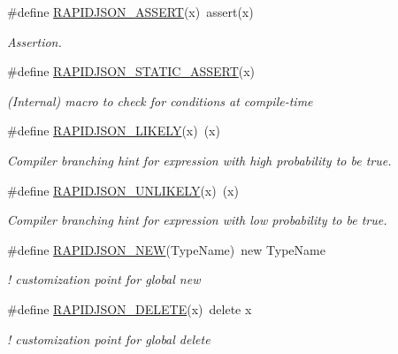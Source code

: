 \begin{DoxyCompactItemize}
\item 
\#define \hyperlink{a00833_gabeba18d612187bad2ac62aed9276d47c}{R\+A\+P\+I\+D\+J\+S\+O\+N\+\_\+\+A\+S\+S\+E\+RT}(x)~assert(x)
\begin{DoxyCompactList}\small\item\em Assertion. \end{DoxyCompactList}\item 
\#define \hyperlink{a00677_af95188da1d8eb6d4b148fe9ce71cd7c4}{R\+A\+P\+I\+D\+J\+S\+O\+N\+\_\+\+S\+T\+A\+T\+I\+C\+\_\+\+A\+S\+S\+E\+RT}(x)
\begin{DoxyCompactList}\small\item\em (Internal) macro to check for conditions at compile-\/time \end{DoxyCompactList}\item 
\#define \hyperlink{a00833_ga5dc14176a9e71ace282404b0bcda57a1}{R\+A\+P\+I\+D\+J\+S\+O\+N\+\_\+\+L\+I\+K\+E\+LY}(x)~(x)
\begin{DoxyCompactList}\small\item\em Compiler branching hint for expression with high probability to be true. \end{DoxyCompactList}\item 
\#define \hyperlink{a00833_ga6a2b1695c13e77ae425e3cbac980ccb5}{R\+A\+P\+I\+D\+J\+S\+O\+N\+\_\+\+U\+N\+L\+I\+K\+E\+LY}(x)~(x)
\begin{DoxyCompactList}\small\item\em Compiler branching hint for expression with low probability to be true. \end{DoxyCompactList}\item 
\#define \hyperlink{a00677_abdc7cd7902748ffe6626d71c59a73c3b}{R\+A\+P\+I\+D\+J\+S\+O\+N\+\_\+\+N\+EW}(Type\+Name)~new Type\+Name\hypertarget{a00677_abdc7cd7902748ffe6626d71c59a73c3b}{}\label{a00677_abdc7cd7902748ffe6626d71c59a73c3b}

\begin{DoxyCompactList}\small\item\em ! customization point for global {\ttfamily new} \end{DoxyCompactList}\item 
\#define \hyperlink{a00677_a52c941c3fdd646527cdcd42aa846a28a}{R\+A\+P\+I\+D\+J\+S\+O\+N\+\_\+\+D\+E\+L\+E\+TE}(x)~delete x\hypertarget{a00677_a52c941c3fdd646527cdcd42aa846a28a}{}\label{a00677_a52c941c3fdd646527cdcd42aa846a28a}

\begin{DoxyCompactList}\small\item\em ! customization point for global {\ttfamily delete} \end{DoxyCompactList}\end{DoxyCompactItemize}
